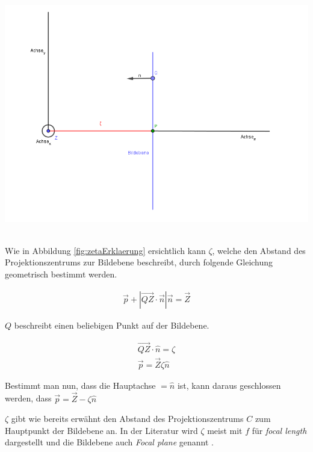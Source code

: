 \begin{minipage}{\linewidth}
	\centering
	\includegraphics[width=1.\linewidth]{images/ZetaHerleitung.png}
	\label{fig:zetaErklaerung}
\end{minipage}\\

Wie in Abbildung \ref{fig:zetaErklaerung} ersichtlich kann $\zeta$, welche den Abstand des Projektionszentrums zur Bildebene beschreibt, durch folgende Gleichung geometrisch bestimmt werden.

\begin{gather}
\vec{p}+|\vec{QZ} \cdot \vec{n}|\vec{n} = \vec{Z}
\end{gather}

$Q$ beschreibt einen beliebigen Punkt auf der Bildebene.

\begin{gather}
\vec{QZ} \cdot \hat{n} = \zeta\\
\vec{p}= \vec{Z}\zeta \hat{n}
\end{gather}

Bestimmt man nun, dass die Hauptachse $= \hat{n}$ ist, kann daraus geschlossen werden, dass $\vec{p} = \vec{Z} - \zeta \hat{n}$

$\zeta$ gibt wie bereits erwähnt den Abstand des Projektionszentrums $C$ zum Hauptpunkt der Bildebene an. 
In der Literatur  wird $\zeta$ meist mit $f$ für \textit{focal length} dargestellt und die Bildebene auch \textit{Focal plane} genannt \cite{HZ}.\\

